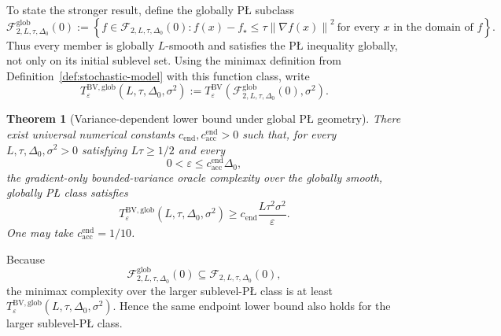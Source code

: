 \documentclass[11pt]{article}
\newtheorem{theorem}{Theorem}[section]
\newcommand{\norm}[1]{\left\lVert #1\right\rVert}
\begin{document}
To state the stronger result, define the globally P\L{} subclass
\[
\mathcal F^{\mathrm{glob}}_{2,L,\tau,\Delta_0}(0)
:=
\left\{
f\in\mathcal F_{2,L,\tau,\Delta_0}(0):
f(x)-f_\star\le\tau\norm{\nabla f(x)}^2
\ \text{for every }x\text{ in the domain of }f
\right\}.
\]
Thus every member is globally \(L\)-smooth and satisfies the P\L{} inequality globally, not only on its initial
sublevel set. Using the minimax definition from Definition~\ref{def:stochastic-model} with this function
class, write
\[
T_\varepsilon^{\mathrm{BV,glob}}(L,\tau,\Delta_0,\sigma^2)
:=
T_\varepsilon^{\mathrm{BV}}
\left(\mathcal F^{\mathrm{glob}}_{2,L,\tau,\Delta_0}(0),\sigma^2\right).
\]


\begin{theorem}[Variance-dependent lower bound under global P\L{} geometry]
\label{thm:stochastic-pl-endpoint}
There exist universal numerical constants $c_{\mathrm{end}},c_{\mathrm{acc}}^{\mathrm{end}}>0$ such that, for every
$L,\tau,\Delta_0,\sigma^2>0$ satisfying $L\tau\ge1/2$ and every
\[
0<\varepsilon\le c_{\mathrm{acc}}^{\mathrm{end}}\Delta_0,
\]
the gradient-only bounded-variance oracle complexity over the globally smooth, globally P\L{} class satisfies
\[
T_\varepsilon^{\mathrm{BV,glob}}(L,\tau,\Delta_0,\sigma^2)
\ge
c_{\mathrm{end}}\frac{L\tau^2\sigma^2}{\varepsilon}.
\]
One may take $c_{\mathrm{acc}}^{\mathrm{end}}=1/10$.
\end{theorem}

Because
\[
\mathcal F^{\mathrm{glob}}_{2,L,\tau,\Delta_0}(0)
\subseteq
\mathcal F_{2,L,\tau,\Delta_0}(0),
\]
the minimax complexity over the larger sublevel-P\L{} class is at least
\(T_\varepsilon^{\mathrm{BV,glob}}(L,\tau,\Delta_0,\sigma^2)\). Hence the same endpoint lower bound also holds for
the larger sublevel-P\L{} class.
\end{document}
